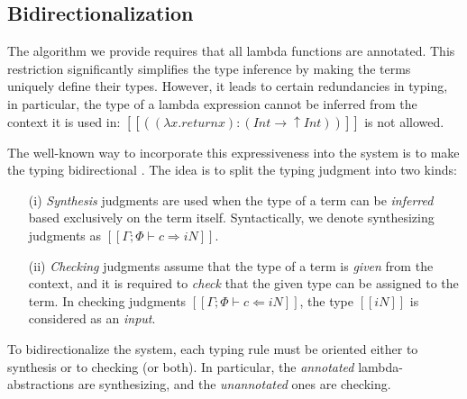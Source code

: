 \subsection{Bidirectionalization}






The algorithm we provide requires that all lambda functions are annotated. 
This restriction significantly simplifies the type inference by making the 
terms uniquely define their types. However, it leads to certain redundancies
in typing, in particular, the type of a lambda expression cannot be inferred 
from the context it is used in: $[[((λ x . return x) : (Int → ↑Int))]]$
is not allowed.

The well-known way to incorporate this expressiveness into the system
is to make the typing bidirectional \cite{dunfield2020:bidirectional}.
The idea is to split the typing judgment into two kinds:
\begin{enumerate}
    \item[(i)] \emph{Synthesis} 
        judgments are used when the type of a term can be \emph{inferred}
        based exclusively on the term itself. 
        Syntactically, we denote synthesizing judgments
        as $[[Γ ; Φ ⊢ c ⇒ iN]]$.
    \item[(ii)] \emph{Checking} judgments 
        assume that the type of a term is \emph{given}
        from the context, and 
        it is required to \emph{check} that the given
        type can be assigned to the term.
        In checking judgments $[[Γ ; Φ ⊢ c ⇐ iN]]$, 
        the type $[[iN]]$ is considered as an \emph{input}.
\end{enumerate}

To bidirectionalize the system, each typing rule 
must be oriented either to synthesis or to checking (or both).
In particular, the \emph{annotated} lambda-abstractions are
synthesizing, and the \emph{unannotated} ones are checking.

